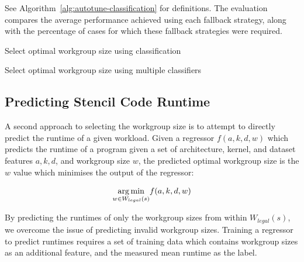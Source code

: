 See Algorithm~\ref{alg:autotune-classification} for definitions. The
evaluation compares the average performance achieved using each
fallback strategy, along with the percentage of cases for which these
fallback strategies were required.


\begin{algorithm}

\caption{Select optimal workgroup size using classification}
\label{alg:autotune-classification}
\end{algorithm}


\begin{algorithm}

\caption{Select optimal workgroup size using multiple classifiers}
\label{alg:autotune-classification2}
\end{algorithm}



\subsection{Predicting Stencil Code Runtime}

 A second approach to selecting the
workgroup size is to attempt to directly predict the runtime of a
given workload. Given a regressor $f(a,k,d,w)$ which predicts the
runtime of a program given a set of architecture, kernel, and dataset
features $a,k,d$, and workgroup size $w$, the predicted optimal
workgroup size is the $w$ value which minimises the output of the
regressor:

\begin{equation}
  \underset{w \in W_{legal}(s)}{\operatorname*{arg\,min}} f(a,k,d,w)
\end{equation}

By predicting the runtimes of only the workgroup sizes from within
$W_{legal}(s)$, we overcome the issue of predicting invalid workgroup
sizes. Training a regressor to predict runtimes requires a set of
training data which contains workgroup sizes as an additional feature,
and the measured mean runtime as the label.

% 

